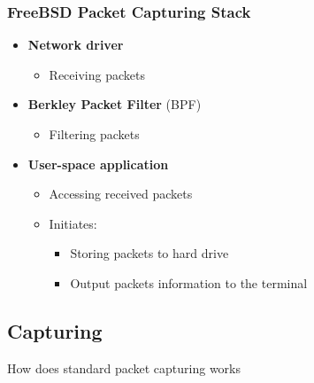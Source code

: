 \documentclass{beamer}
\begin{document}
\begin{frame}
\frametitle{FreeBSD Packet Capturing Stack}
\begin{itemize}
	\item \textbf{Network driver}
		\begin{itemize}
			\item Receiving packets\newline
		\end{itemize}
	\item \textbf{Berkley Packet Filter} (BPF)
		\begin{itemize}
			\item Filtering packets\newline
		\end{itemize}
	\item \textbf{User-space application}
		\begin{itemize}
			\item Accessing received packets
			\item Initiates:
				\begin{itemize}
					\item Storing packets to hard drive
					\item Output packets information to the terminal
				\end{itemize}
		\end{itemize}
\end{itemize}
\end{frame}

\subsection*{Capturing}
\begin{frame}
	\begin{center}
	\huge{How does standard packet capturing works}
	\end{center}
\end{frame}
\end{document}
